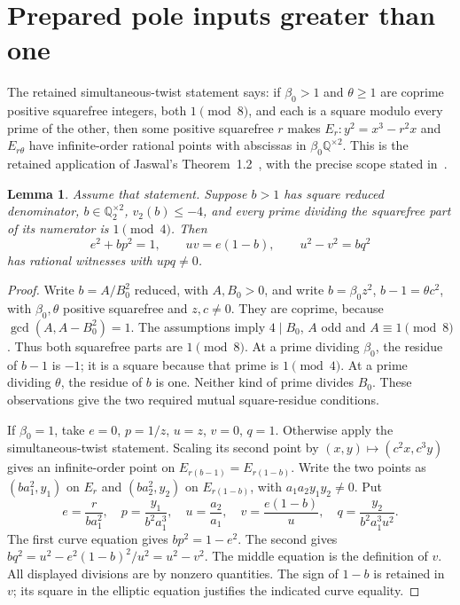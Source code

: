 \documentclass[11pt,a4paper]{article}
\newtheorem{lemma}[theorem]{Lemma}
\newcommand{\Q}{\mathbb Q}\newcommand{\Z}{\mathbb Z}
\begin{document}
\section{Prepared pole inputs greater than one}\label{sec:pole}
The retained simultaneous-twist statement says: if $\beta_0>1$
and $\theta\ge1$ are coprime positive squarefree integers, both
$1\pmod8$, and each is a square modulo every prime of the other,
then some positive squarefree $r$ makes
$E_r:y^2=x^3-r^2x$ and $E_{r\theta}$ have infinite-order rational
points with abscissas in $\beta_0\Q^{\times2}$.
This is the retained application of Jaswal's
Theorem~1.2~\cite{Jaswal}, with the precise scope stated in~\cite{Pole}.

\begin{lemma}\label{lem:largepole}
Assume that statement. Suppose $b>1$ has square reduced denominator,
$b\in\Q_2^{\times2}$, $v_2(b)\le-4$, and every prime dividing
the squarefree part of its numerator is $1\pmod4$.
Then
\[
 e^2+bp^2=1,\qquad uv=e(1-b),\qquad u^2-v^2=bq^2
\]
has rational witnesses with $upq\ne0$.
\end{lemma}
\begin{proof}
Write $b=A/B_0^2$ reduced, with $A,B_0>0$, and write
$b=\beta_0 z^2$, $b-1=\theta c^2$, with $\beta_0,\theta$
positive squarefree and $z,c\ne0$. They are coprime, because
$\gcd(A,A-B_0^2)=1$.
The assumptions imply $4\mid B_0$, $A$ odd and $A\equiv1\pmod8$.
Thus both squarefree parts are $1\pmod8$.
At a prime dividing $\beta_0$, the residue of $b-1$ is $-1$;
it is a square because that prime is $1\pmod4$.
At a prime dividing $\theta$, the residue of $b$ is one.
Neither kind of prime divides $B_0$. These observations give the
two required mutual square-residue conditions.

If $\beta_0=1$, take $e=0$, $p=1/z$, $u=z$, $v=0$, $q=1$.
Otherwise apply the simultaneous-twist statement. Scaling its second
point by $(x,y)\mapsto(c^2x,c^3y)$ gives an infinite-order point
on $E_{r(b-1)}=E_{r(1-b)}$. Write the two points as
$(ba_1^2,y_1)$ on $E_r$ and $(ba_2^2,y_2)$ on $E_{r(1-b)}$,
with $a_1a_2y_1y_2\ne0$. Put
\[
 e=\frac{r}{ba_1^2},\quad p=\frac{y_1}{b^2a_1^3},\quad
 u=\frac{a_2}{a_1},\quad v=\frac{e(1-b)}u,\quad
 q=\frac{y_2}{b^2a_1^3u^2}.
\]
The first curve equation gives $bp^2=1-e^2$.
The second gives $bq^2=u^2-e^2(1-b)^2/u^2=u^2-v^2$.
The middle equation is the definition of $v$.
All displayed divisions are by nonzero quantities. The sign of
$1-b$ is retained in $v$; its square in the elliptic equation
justifies the indicated curve equality.
\end{proof}
\end{document}
